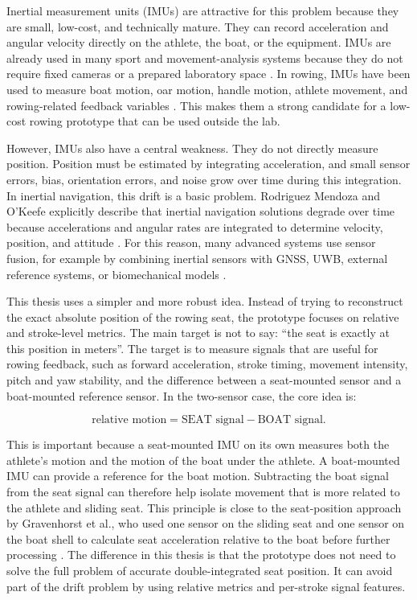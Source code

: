 Inertial measurement units (IMUs) are attractive for this problem because they are small, low-cost, and technically mature. They can record acceleration and angular velocity directly on the athlete, the boat, or the equipment. IMUs are already used in many sport and movement-analysis systems because they do not require fixed cameras or a prepared laboratory space \cite{arlotti_benefits_2022}. In rowing, IMUs have been used to measure boat motion, oar motion, handle motion, athlete movement, and rowing-related feedback variables \cite{llosa_remote_2009,junker_sensor-based_2015,hohmuth_wireless_2023,rodriguez_mendoza_wearable_2024}. This makes them a strong candidate for a low-cost rowing prototype that can be used outside the lab.

However, IMUs also have a central weakness. They do not directly measure position. Position must be estimated by integrating acceleration, and small sensor errors, bias, orientation errors, and noise grow over time during this integration. In inertial navigation, this drift is a basic problem. Rodriguez Mendoza and O'Keefe explicitly describe that inertial navigation solutions degrade over time because accelerations and angular rates are integrated to determine velocity, position, and attitude \cite{rodriguez_mendoza_wearable_2024}. For this reason, many advanced systems use sensor fusion, for example by combining inertial sensors with GNSS, UWB, external reference systems, or biomechanical models \cite{cloud_adaptive_2019,rodriguez_mendoza_wearable_2024,ruffaldi_sensor_2015}.

This thesis uses a simpler and more robust idea. Instead of trying to reconstruct the exact absolute position of the rowing seat, the prototype focuses on relative and stroke-level metrics. The main target is not to say: ``the seat is exactly at this position in meters''. The target is to measure signals that are useful for rowing feedback, such as forward acceleration, stroke timing, movement intensity, pitch and yaw stability, and the difference between a seat-mounted sensor and a boat-mounted reference sensor. In the two-sensor case, the core idea is:

\begin{equation}
  \text{relative motion} = \text{SEAT signal} - \text{BOAT signal}.
\end{equation}

This is important because a seat-mounted IMU on its own measures both the athlete's motion and the motion of the boat under the athlete. A boat-mounted IMU can provide a reference for the boat motion. Subtracting the boat signal from the seat signal can therefore help isolate movement that is more related to the athlete and sliding seat. This principle is close to the seat-position approach by Gravenhorst et al., who used one sensor on the sliding seat and one sensor on the boat shell to calculate seat acceleration relative to the boat before further processing \cite{gravenhorst_self-aligning_2012}. The difference in this thesis is that the prototype does not need to solve the full problem of accurate double-integrated seat position. It can avoid part of the drift problem by using relative metrics and per-stroke signal features.

